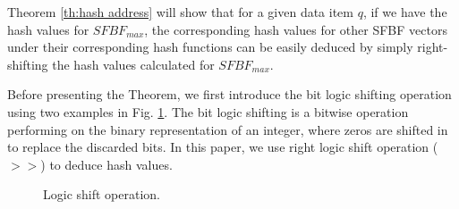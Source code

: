 \documentclass[10pt,journal,compsoc]{IEEEtran}
\begin{document}
Theorem \ref{th:hash address} will show that for a given data item $q$, if we have the hash values for $SFBF_{max}$,
 the corresponding hash values for other SFBF vectors under their corresponding hash functions can be easily deduced by simply right-shifting the hash values calculated for $SFBF_{max}$.

Before presenting the Theorem, we first introduce the bit logic shifting operation using two examples in Fig. \ref{fig:Logic shift operation}. The bit logic shifting is a bitwise operation performing on the binary representation of an integer, where zeros are shifted in to replace the discarded bits. In this paper, we use right logic shift operation ($>>$) to deduce hash values.


\begin{figure}[!h]
\centering
{}
\caption{Logic shift operation.}
\label{fig:Logic shift operation}
\end{figure}
\end{document}
